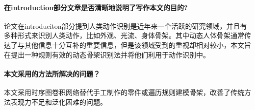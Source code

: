 \documentclass[a4paper,12pt,onecolumn,songti]{article}
\begin{document}
		\paragraph{在introduction部分⽂章是否清晰地说明了写作本⽂的目的?}
		论文在introduciton部分提到人类动作识别是近年来一个活跃的研究领域，并且有多种形式来识别人类动作，比如外观、光流、身体骨架。其中动态人体骨架通常传达了与其他信息十分互补的重要信息，但是该领域受到的重视却相对较小，本文旨在提出一种规则有效的动态骨架识别法并将他们利用于动作识别中。
		\paragraph{本文采用的方法所解决的问题？}
		本文采用时序图卷积网络替代手工制作的零件或遍历规则建模骨架，改善了传统方法表现力不足和泛化困难的问题。
		
\end{document}
